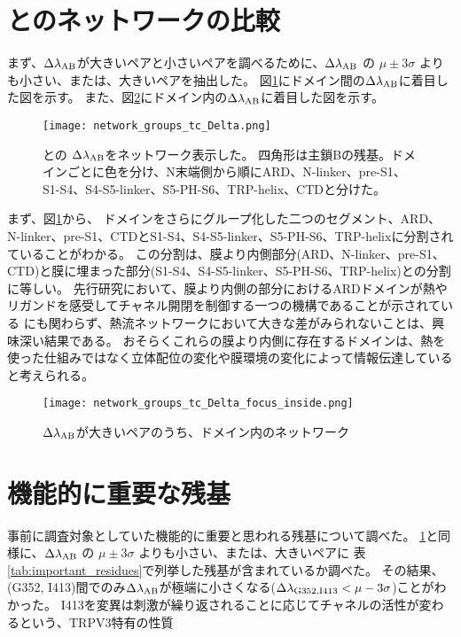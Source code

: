 \section{\openFortyTwo と\closeFortyTwo のネットワークの比較}
\label{sec:network_comparison}

まず、$\Delta \lambda_{\rm{AB}}$が大きいペアと小さいペアを調べるために、$\Delta \lambda_{\rm{AB}}$ の $\mu \pm 3 \sigma$ よりも小さい、または、大きいペアを抽出した。
図\ref{fig:network_groups_tc_Delta}にドメイン間の$\Delta \lambda_{\rm{AB}}$に着目した図を示す。
また、図\ref{fig:network_groups_tc_Delta_focus_inside}にドメイン内の$\Delta \lambda_{\rm{AB}}$に着目した図を示す。

\begin{figure}
  \centering
  \texttt{[image: network\_groups\_tc\_Delta.png]}
  \caption{\openFortyTwo と\closeFortyTwo の $\Delta \lambda_{\rm{AB}}$をネットワーク表示した。
            四角形は主鎖Bの残基。ドメインごとに色を分け、N末端側から順にARD、N-linker、pre-S1、S1-S4、S4-S5-linker、S5-PH-S6、TRP-helix、CTDと分けた。
            \autocite{pumroy_structural_2020}}
  \label{fig:network_groups_tc_Delta}
\end{figure}

まず、図\ref{fig:network_groups_tc_Delta}から、
ドメインをさらにグループ化した二つのセグメント、ARD、N-linker、pre-S1、CTDとS1-S4、S4-S5-linker、S5-PH-S6、TRP-helixに分割されていることがわかる。
この分割は、膜より内側部分(ARD、N-linker、pre-S1、CTD)と膜に埋まった部分(S1-S4、S4-S5-linker、S5-PH-S6、TRP-helix)との分割に等しい。
先行研究において、膜より内側の部分におけるARDドメインが熱やリガンドを感受してチャネル開閉を制御する一つの機構であることが示されている\autocite{phelps_differential_2010,phelps_insights_2007,shi_crystal_2013}
にも関わらず、熱流ネットワークにおいて大きな差がみられないことは、興味深い結果である。
おそらくこれらの膜より内側に存在するドメインは、熱を使った仕組みではなく立体配位の変化や膜環境の変化によって情報伝達していると考えられる。

\begin{figure}
  \centering
  \texttt{[image: network\_groups\_tc\_Delta\_focus\_inside.png]}
  \caption{$\Delta \lambda_{\rm{AB}}$が大きいペアのうち、ドメイン内のネットワーク}
  \label{fig:network_groups_tc_Delta_focus_inside}
\end{figure}

\section{機能的に重要な残基}

事前に調査対象としていた機能的に重要と思われる残基について調べた。
\ref{sec:network_comparison}と同様に、$\Delta \lambda_{\rm{AB}}$ の $\mu \pm 3 \sigma$ よりも小さい、または、大きいペアに
表\ref{tab:important_residues}で列挙した残基が含まれているか調べた。
その結果、(G352, I413)間でのみ$\Delta \lambda_{\rm{AB}}$が極端に小さくなる($\Delta \lambda_{\rm{G352},\rm{I413}} < \mu - 3\sigma$)ことがわかった。
I413を変異は刺激が繰り返されることに応じてチャネルの活性が変わるという、TRPV3特有の性質